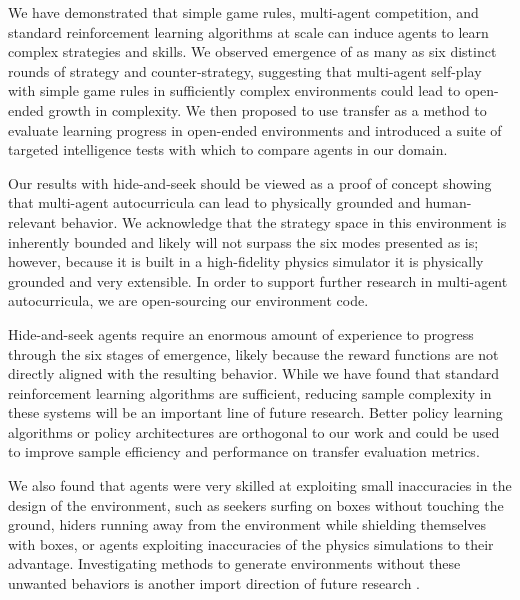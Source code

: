 We have demonstrated that simple game rules, multi-agent competition, and standard reinforcement learning algorithms at scale can induce agents to learn complex strategies and skills.
We observed emergence of as many as six distinct rounds of strategy and counter-strategy, suggesting that multi-agent self-play with simple game rules in sufficiently complex environments could lead to open-ended growth in complexity.
We then proposed to use transfer as a method to evaluate learning progress in open-ended environments and introduced a suite of targeted intelligence tests with which to compare agents in our domain.

Our results with hide-and-seek should be viewed as a proof of concept showing that multi-agent autocurricula can lead to physically grounded and human-relevant behavior.
We acknowledge that the strategy space in this environment is inherently bounded and likely will not surpass the six modes presented as is; however, because it is built in a high-fidelity physics simulator it is physically grounded and very extensible. In order to support further research in multi-agent autocurricula, we are open-sourcing our environment code.

Hide-and-seek agents require an enormous amount of experience to progress through the six stages of emergence, likely because the reward functions are not directly aligned with the resulting behavior. While we have found that standard reinforcement learning algorithms are sufficient, reducing sample complexity in these systems will be an important line of future research. Better policy learning algorithms or policy architectures are orthogonal to our work and could be used to improve sample efficiency and performance on transfer evaluation metrics.

We also found that agents were very skilled at exploiting small inaccuracies in the design of the environment, such as seekers surfing on boxes without touching the ground, hiders running away from the environment while shielding themselves with boxes, or agents exploiting inaccuracies of the physics simulations to their advantage. Investigating methods to generate environments without these unwanted behaviors is another import direction of future research \citep{amodei2016, lehman2018}.
